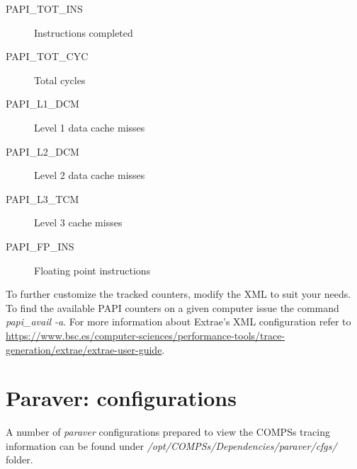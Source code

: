 \begin{description}
 \item [PAPI\_TOT\_INS] Instructions completed
 \item [PAPI\_TOT\_CYC] Total cycles
 \item [PAPI\_L1\_DCM] Level 1 data cache misses
 \item [PAPI\_L2\_DCM] Level 2 data cache misses
 \item [PAPI\_L3\_TCM] Level 3 cache misses
 \item [PAPI\_FP\_INS] Floating point instructions
\end{description}


To further customize the tracked counters, modify the XML to suit your needs. To find the available PAPI counters on a given computer issue the command \textit{papi\_avail -a}. For more information about Extrae's XML configuration refer to \url{https://www.bsc.es/computer-sciences/performance-tools/trace-generation/extrae/extrae-user-guide}.

\section{Paraver: configurations}
\label{sec:configs}

A number of \textit{paraver} configurations prepared to view the COMPSs tracing information can be found under \textit{/opt/COMPSs/Dependencies/paraver/cfgs/} folder.


